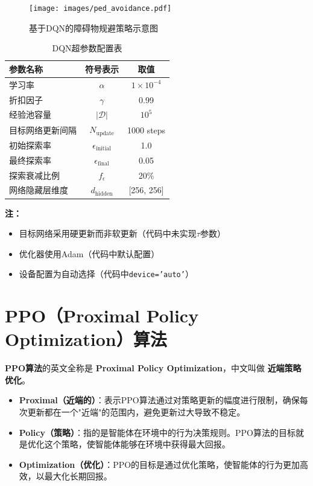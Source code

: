 \begin{figure}[H]
    \centering
    \texttt{[image: images/ped\_avoidance.pdf]}
    \caption{基于DQN的障碍物规避策略示意图}
    \label{fig:avoidance}
\end{figure}

\begin{table}[!ht]
    \centering
    \caption{DQN超参数配置表}
    \label{tab:dqn_params}
    \begin{tabular}{lcc}
        \toprule
        参数名称 & 符号表示 & 取值 \\
        \midrule
        学习率 & $\alpha$ & $1\times10^{-4}$ \\
        折扣因子 & $\gamma$ & 0.99 \\
        经验池容量 & $|\mathcal{D}|$ & $10^5$ \\
        目标网络更新间隔 & $N_{\text{update}}$ & 1000 steps \\
        初始探索率 & $\epsilon_{\text{initial}}$ & 1.0 \\
        最终探索率 & $\epsilon_{\text{final}}$ & 0.05 \\
        探索衰减比例 & $f_{\epsilon}$ & 20\% \\  %
        网络隐藏层维度 & $d_{\text{hidden}}$ & [256, 256] \\
        \bottomrule
    \end{tabular}
\end{table}

\noindent \textbf{注：}
\begin{itemize}
    \item 目标网络采用硬更新而非软更新（代码中未实现$\tau$参数）
    \item 优化器使用Adam（代码中默认配置）
    \item 设备配置为自动选择（代码中\texttt{device='auto'}）
\end{itemize}

\section{PPO（Proximal Policy Optimization）算法}

\textbf{PPO算法}的英文全称是 \textbf{Proximal Policy Optimization}，中文叫做 \textbf{近端策略优化}。

\begin{itemize}
    \item \textbf{Proximal（近端的）}：表示PPO算法通过对策略更新的幅度进行限制，确保每次更新都在一个"近端"的范围内，避免更新过大导致不稳定。
    \item \textbf{Policy（策略）}：指的是智能体在环境中的行为决策规则。PPO算法的目标就是优化这个策略，使智能体能够在环境中获得最大回报。
    \item \textbf{Optimization（优化）}：PPO的目标是通过优化策略，使智能体的行为更加高效，以最大化长期回报。
\end{itemize}

